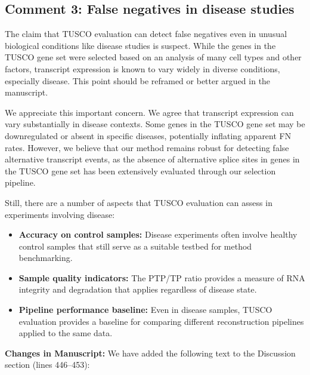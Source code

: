 \documentclass[11pt]{article}
\newcommand{\tuscoGeneSet}{TUSCO gene set}
\newcommand{\tuscoEvaluation}{TUSCO evaluation}
\begin{document}
\subsection{Comment 3: False negatives in disease studies}

\begin{reviewercomment}
The claim that TUSCO evaluation can detect false negatives even in unusual biological conditions like disease studies is suspect. While the genes in the TUSCO gene set were selected based on an analysis of many cell types and other factors, transcript expression is known to vary widely in diverse conditions, especially disease. This point should be reframed or better argued in the manuscript.
\end{reviewercomment}

\begin{responseboxnew}
We appreciate this important concern. We agree that transcript expression can vary substantially in disease contexts. Some genes in the \tuscoGeneSet{} may be downregulated or absent in specific diseases, potentially inflating apparent FN rates. However, we believe that our method remains robust for detecting false alternative transcript events, as the absence of alternative splice sites in genes in the \tuscoGeneSet{} has been extensively evaluated through our selection pipeline.
    \vspace{0.3cm}
    
Still, there are a number of aspects that \tuscoEvaluation{} can assess in experiments involving disease:
    \begin{itemize}
      \item \textbf{Accuracy on control samples:} Disease experiments often involve healthy control samples that still serve as a suitable testbed for method benchmarking.

      \item \textbf{Sample quality indicators:} The PTP/TP ratio provides a
        measure of RNA integrity and degradation that applies regardless of
        disease state.

      \item \textbf{Pipeline performance baseline:} Even in disease samples, TUSCO evaluation
        provides a baseline for comparing different reconstruction pipelines applied
        to the same data.
    \end{itemize}

    \vspace{0.3cm}
    \textbf{Changes in Manuscript:} We have added the following text to the Discussion section (lines 446--453):


\end{responseboxnew}
\end{document}
